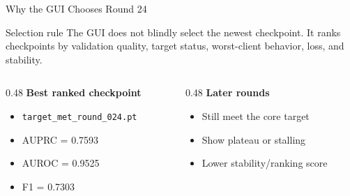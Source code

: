 \documentclass[aspectratio=169,10pt]{beamer}
\begin{document}
\begin{frame}{Why the GUI Chooses Round 24}
  \begin{block}{Selection rule}
    The GUI does not blindly select the newest checkpoint. It ranks checkpoints by validation quality, target status, worst-client behavior, loss, and stability.
  \end{block}
  \begin{columns}[T]
    \begin{column}{0.48\textwidth}
      \textbf{Best ranked checkpoint}
      \begin{itemize}
        \item \texttt{target\_met\_round\_024.pt}
        \item AUPRC = 0.7593
        \item AUROC = 0.9525
        \item F1 = 0.7303
      \end{itemize}
    \end{column}
    \begin{column}{0.48\textwidth}
      \textbf{Later rounds}
      \begin{itemize}
        \item Still meet the core target
        \item Show plateau or stalling
        \item Lower stability/ranking score
      \end{itemize}
    \end{column}
  \end{columns}
\end{frame}
\end{document}
